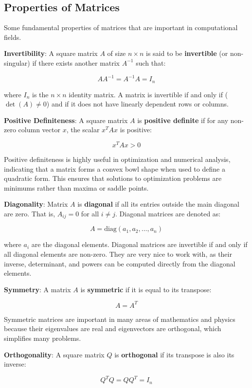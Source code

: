 \documentclass[12pt, twoside,hidelinks]{article}
\theoremstyle{definition}
\numberwithin{equation}{section}
\begin{document}
\subsection{Properties of Matrices}

Some fundamental properties of matrices that are important in computational fields.

\textbf{Invertibility}: A square matrix $A$ of size $n \times n$ is said to be \textbf{invertible} (or non-singular) if there exists another matrix $A^{-1}$ such that:

\[
AA^{-1} = A^{-1}A = I_n
\]

where $I_n$ is the $n \times n$ identity matrix. A matrix is invertible if and only if ($\det(A) \neq 0$) and if it does not have linearly dependent rows or columns.

\textbf{Positive Definiteness}: A square matrix $A$ is \textbf{positive definite} if for any non-zero column vector $x$, the scalar $x^TAx$ is positive:

\[
x^TAx > 0
\]

Positive definiteness is highly useful in optimization and numerical analysis, indicating that a matrix forms a convex bowl shape when used to define a quadratic form. This  ensures that solutions to optimization problems are minimums rather than maxima or saddle points.

\textbf{Diagonality}: Matrix $A$ is \textbf{diagonal} if all its entries outside the main diagonal are zero. That is, $A_{ij} = 0$ for all $i \neq j$. Diagonal matrices are denoted as:

\[
A = \mathrm{diag}(a_1, a_2, \ldots, a_n)
\]

where $a_i$ are the diagonal elements. Diagonal matrices are invertible if and only if all diagonal elements are non-zero. They are very nice to work with, as their inverse, determinant, and powers can be computed directly from the diagonal elements.

\textbf{Symmetry}: A matrix $A$ is \textbf{symmetric} if it is equal to its transpose:

\[
A = A^T
\]

Symmetric matrices are important in many areas of mathematics and physics because their eigenvalues are real and eigenvectors are orthogonal, which simplifies many problems.

\textbf{Orthogonality}: A square matrix $Q$ is \textbf{orthogonal} if its transpose is also its inverse:

\[
Q^TQ = QQ^T = I_n
\]
\end{document}
